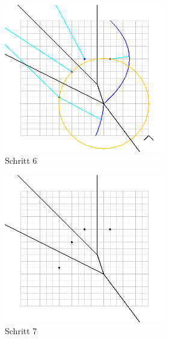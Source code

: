 \begin{figure}[h]
\begin{center}
\includegraphics[width=7cm]{capture6}
\end{center}
\caption{Schritt 6}
\label{fig:c6}
\end{figure}

\begin{figure}[h]
\begin{center}
\includegraphics[width=7cm]{capture7}
\end{center}
\caption{Schritt 7}
\label{fig:c7}
\end{figure}